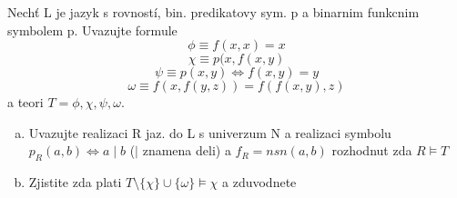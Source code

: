 Nechť L je jazyk s rovností, bin. predikatovy sym. p a binarnim funkcnim symbolem
p. Uvazujte formule 
$$\phi \equiv f(x,x)=x$$
$$\chi \equiv p(x,f(x,y)$$
$$\psi \equiv p(x,y) \Leftrightarrow f(x,y)=y$$
$$\omega \equiv f(x,f(y,z))=f(f(x,y),z)$$
a teori $T = {\phi, \chi, \psi, \omega}$.

\begin{enumerate}[a)]
  \item Uvazujte realizaci R jaz. do L s univerzum N a realizaci symbolu
  $p_R(a,b)\Leftrightarrow a \mid b$ ($\mid$ znamena deli) a $f_R = nsn(a,b)$ rozhodnut
  zda $R \models T$
  \item Zjistite zda plati $T\setminus\{\chi\}\cup\{\omega\}\models\chi$ a
  zduvodnete
\end{enumerate}

